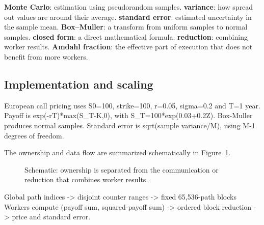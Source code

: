 \documentclass[11pt,a4paper]{article}
\newcommand{\term}[2]{\textbf{#1}: #2.}
\begin{document}
\begin{tcolorbox}[title=Terms used in this section]\small \term{Monte Carlo}{estimation using pseudorandom samples} \term{variance}{how spread out values are around their average} \term{standard error}{estimated uncertainty in the sample mean} \term{Box--Muller}{a transform from uniform samples to normal samples} \term{closed form}{a direct mathematical formula} \term{reduction}{combining worker results} \term{Amdahl fraction}{the effective part of execution that does not benefit from more workers}\end{tcolorbox}

\subsection{Implementation and scaling}

European call pricing uses S0=\allowbreak{}100, strike=\allowbreak{}100, r=\allowbreak{}0.05, sigma=\allowbreak{}0.2 and T=\allowbreak{}1 year. Payoff is exp(-rT)*max(S\_\allowbreak{}T-K,0), with S\_\allowbreak{}T=\allowbreak{}100*exp(0.03+0.2Z). Box-Muller produces normal samples. Standard error is sqrt(sample variance/\allowbreak{}M), using M-1 degrees of freedom.


The ownership and data flow are summarized schematically in Figure~\ref{fig:flow3}.

\begin{figure}[htbp]\centering{}

\caption{Schematic: ownership is separated from the communication or reduction that combines worker results.}\label{fig:flow3}\end{figure}

Global path indices -> disjoint counter ranges -> fixed 65,536-path blocks\newline{} Workers compute (payoff sum, squared-payoff sum) -> ordered block reduction -> price and standard error.
\end{document}
